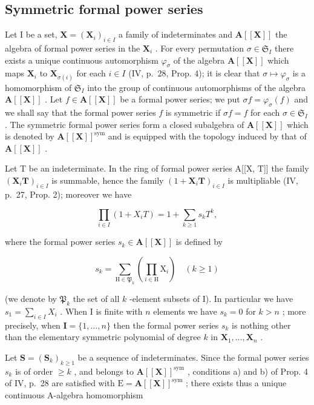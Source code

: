 \subsection{Symmetric formal power series}

Let I be a set, \(\mathbf{X} = (\mathbf{X}_i)_{i\in I}\) a family of indeterminates and \(\mathbf{A}[[\mathbf{X}]]\) the algebra of formal power series in the \(\mathbf{X}_i\) . For every permutation \(\sigma \in \mathfrak{S}_I\) there exists a unique continuous automorphism \(\varphi_{\sigma}\) of the algebra \(\mathbf{A}[[\mathbf{X}]]\) which maps \(\mathbf{X}_i\) to \(\mathbf{X}_{\sigma (i)}\) for each \(i\in I\) (IV, p.~28, Prop. 4); it is clear that \(\sigma \mapsto \varphi_{\sigma}\) is a homomorphism of \(\mathfrak{S}_I\) into the group of continuous automorphisms of the algebra \(\mathbf{A}[[\mathbf{X}]]\) . Let \(f\in \mathbf{A}[[\mathbf{X}]]\) be a formal power series; we put \(\sigma f = \varphi_{\sigma}(f)\) and we shall say that the formal power series \(f\) is symmetric if \(\sigma f = f\) for each \(\sigma \in \mathfrak{S}_I\) . The symmetric formal power series form a closed subalgebra of \(\mathbf{A}[[\mathbf{X}]]\) which is denoted by \(\mathbf{A}[[\mathbf{X}]]^{\mathrm{sym}}\) and is equipped with the topology induced by that of \(\mathbf{A}[[\mathbf{X}]]\) .

Let T be an indeterminate. In the ring of formal power series A{[}{[}X, T{]}{]} the family \((\mathbf{X}_i\mathbf{T})_{i\in I}\) is summable, hence the family \((1 + \mathbf{X}_i\mathbf{T})_{i\in I}\) is multipliable (IV, p.~27, Prop. 2); moreover we have

\[
\prod_ {i \in I} (1 + X _ {i} T) = 1 + \sum_ {k \geqslant 1} s _ {k} T ^ {k},\tag{14}
\]

where the formal power series \(s_k \in \mathbf{A}[[\mathbf{X}]]\) is defined by

\[
s _ {k} = \sum_ {\mathrm{H} \in \mathfrak {P} _ {k}} \left(\prod_ {i \in \mathrm{H}} \mathrm{X} _ {i}\right) \quad (k \geqslant 1)\tag{15}
\]

(we denote by \(\mathfrak{P}_k\) the set of all \(k\) -element subsets of I). In particular we have \(s_1 = \sum_{i \in I} X_i\) . When I is finite with \(n\) elements we have \(s_k = 0\) for \(k > n\) ; more precisely, when \(\mathbf{I} = \{1,\dots,n\}\) then the formal power series \(s_k\) is nothing other than the elementary symmetric polynomial of degree \(k\) in \(\mathbf{X}_1,\ldots,\mathbf{X}_n\) .

Let \(\mathbf{S} = (\mathbf{S}_k)_{k\geqslant 1}\) be a sequence of indeterminates. Since the formal power series \(s_k\) is of order \(\geqslant k\) , and belongs to \(\mathbf{A}[[\mathbf{X}]]^{\mathrm{sym}}\) , conditions a) and b) of Prop. 4 of IV, p.~28 are satisfied with \(\mathrm{E} = \mathbf{A}[[\mathbf{X}]]^{\mathrm{sym}}\) ; there exists thus a unique continuous A-algebra homomorphism

